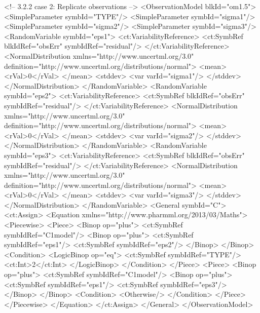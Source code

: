 \documentclass[a4paper,10pt]{article}
\begin{document}
\begin{xmlcode}
<!-- 3.2.2	case 2: Replicate observations -->
<ObservationModel blkId="om1.5">
    <SimpleParameter symbId="TYPE"/>
    <SimpleParameter symbId="sigma1"/>
    <SimpleParameter symbId="sigma2"/>
    <SimpleParameter symbId="sigma3"/>
    <RandomVariable symbId="eps1">
        <ct:VariabilityReference>
            <ct:SymbRef blkIdRef="obsErr" symbIdRef="residual"/>
        </ct:VariabilityReference>
        <NormalDistribution xmlns="http://www.uncertml.org/3.0" definition="http://www.uncertml.org/distributions/normal">
            <mean>
                <rVal>0</rVal>
            </mean>
            <stddev>
                <var varId="sigma1"/> 
            </stddev>
        </NormalDistribution>
    </RandomVariable>
    <RandomVariable symbId="eps2">
        <ct:VariabilityReference>
            <ct:SymbRef blkIdRef="obsErr" symbIdRef="residual"/>
        </ct:VariabilityReference>
        <NormalDistribution xmlns="http://www.uncertml.org/3.0" definition="http://www.uncertml.org/distributions/normal">
            <mean>
                <rVal>0</rVal>
            </mean>
            <stddev>
                <var varId="sigma2"/> 
            </stddev>
        </NormalDistribution>
    </RandomVariable>
    <RandomVariable symbId="eps3">
        <ct:VariabilityReference>
            <ct:SymbRef blkIdRef="obsErr" symbIdRef="residual"/>
        </ct:VariabilityReference>
        <NormalDistribution xmlns="http://www.uncertml.org/3.0" definition="http://www.uncertml.org/distributions/normal">
            <mean>
                <rVal>0</rVal>
            </mean>
            <stddev>
                <var varId="sigma3"/> 
            </stddev>
        </NormalDistribution>
    </RandomVariable>
    <General symbId="C">
        <ct:Assign>
            <Equation xmlns="http://www.pharmml.org/2013/03/Maths">
                <Piecewise>
                    <Piece>
                        <Binop op="plus">
                            <ct:SymbRef symbIdRef="C1model"/>
                            <Binop op="plus">
                                <ct:SymbRef symbIdRef="eps1"/>
                                <ct:SymbRef symbIdRef="eps2"/>
                            </Binop>
                        </Binop>
                        <Condition>
                            <LogicBinop op="eq">
                                <ct:SymbRef symbIdRef="TYPE"/>
                                <ct:Int>2</ct:Int>
                            </LogicBinop>
                        </Condition>
                    </Piece>
                    <Piece>
                        <Binop op="plus">
                            <ct:SymbRef symbIdRef="C1model"/>
                            <Binop op="plus">
                                <ct:SymbRef symbIdRef="eps1"/>
                                <ct:SymbRef symbIdRef="eps3"/>
                            </Binop>
                        </Binop>
                        <Condition>
                            <Otherwise/>
                        </Condition>
                    </Piece>
                </Piecewise>
            </Equation>
        </ct:Assign>
    </General>
</ObservationModel>
\end{xmlcode}
\end{document}

